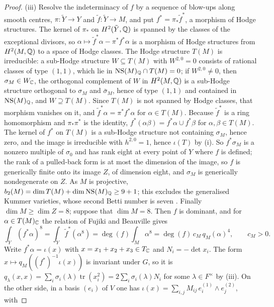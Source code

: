 \begin{proof}
(iii) Resolve the indeterminacy of $f$ by a sequence of blow-ups along
smooth centres, $\pi\colon\tilde{Y}\to Y$ and $\tilde{f}\colon\tilde{Y}\to M$,
and put $f^{*}=\pi_{*}\tilde{f}^{*}$, a morphism of Hodge structures. The
kernel of $\pi_{*}$ on $H^{2}(\tilde{Y},\mathbb{Q})$ is spanned by the classes of
the exceptional divisors, so $\alpha\mapsto\tilde{f}^{*}\alpha-
\pi^{*}f^{*}\alpha$ is a morphism of Hodge structures from $H^{2}(M,\mathbb{Q})$ to a
space of Hodge classes. The Hodge structure $T(M)$ is irreducible: a
sub-Hodge structure $W\subseteq T(M)$ with $W^{2,0}=0$ consists of rational
classes of type $(1,1)$, which lie in $\mathrm{NS}(M)_{\mathbb{Q}}\cap T(M)=0$; if
$W^{2,0}\ne0$, then $\sigma_{M}\in W_{\mathbb{C}}$, the orthogonal complement of $W$
in $H^{2}(M,\mathbb{Q})$ is a sub-Hodge structure orthogonal to $\sigma_{M}$ and
$\bar{\sigma}_{M}$, hence of type $(1,1)$ and contained in $\mathrm{NS}(M)_{\mathbb{Q}}$,
and $W\supseteq T(M)$. Since $T(M)$ is not spanned by Hodge classes, that
morphism vanishes on it, and $\tilde{f}^{*}\alpha=\pi^{*}f^{*}\alpha$ for
$\alpha\in T(M)$. Because $\tilde{f}^{*}$ is a ring homomorphism and
$\pi_{*}\pi^{*}$ is the identity, $f^{*}(\alpha\beta)=f^{*}\alpha\cup
f^{*}\beta$ for $\alpha,\beta\in T(M)$. The kernel of $f^{*}$ on $T(M)$ is a
sub-Hodge structure not containing $\sigma_{M}$, hence zero, and the image is
irreducible with $h^{2,0}=1$, hence $\iota(T)$ by (i). So $f^{*}\sigma_{M}$ is
a nonzero multiple of $\sigma_{0}$ and has rank eight at every point of $Y$
where $f$ is defined; the rank of a pulled-back form is at most the dimension
of the image, so $f$ is generically finite onto its image $Z$, of dimension
eight, and $\sigma_{M}$ is generically nondegenerate on $Z$. As $M$ is
projective, $b_{2}(M)=\dim T(M)+\dim\mathrm{NS}(M)_{\mathbb{Q}}\ge9+1$; this excludes the
generalised Kummer varieties, whose second Betti number is seven
\cite{Bea83}. Finally $\dim M\ge\dim Z=8$; suppose that $\dim M=8$. Then
$f$ is dominant, and for $\alpha\in T(M)_{\mathbb{C}}$ the relation of Fujiki and
Beauville \cite{Bea83,Fuj87} gives
\[
  \int_{Y}(f^{*}\alpha)^{8}=\int_{\tilde{Y}}\tilde{f}^{*}(\alpha^{8})
  =\deg(f)\int_{M}\alpha^{8}=\deg(f)\,c_{M}\,q_{M}(\alpha)^{4},
  \qquad c_{M}>0 .
\]
Write $f^{*}\alpha=\iota(x)$ with $x=x_{1}+x_{2}+x_{3}\in T_{\mathbb{C}}$ and
$N_{i}=-\det x_{i}$. The form $x\mapsto q_{M}((f^{*})^{-1}\iota(x))$ is
invariant under $G$, so it is $q_{\lambda}(x,x)=
\sum_{i}\sigma_{i}(\lambda)\operatorname{tr}(x_{i}^{2})=
2\sum_{i}\sigma_{i}(\lambda)N_{i}$ for some $\lambda\in F^{\times}$ by
(iii). On the other side, in a basis $(e_{i})$ of
$V$ one has $\iota(x)=\sum_{i,j}M_{ij}\,e_{i}^{(1)}\wedge e_{j}^{(2)}$, with

\end{proof}
